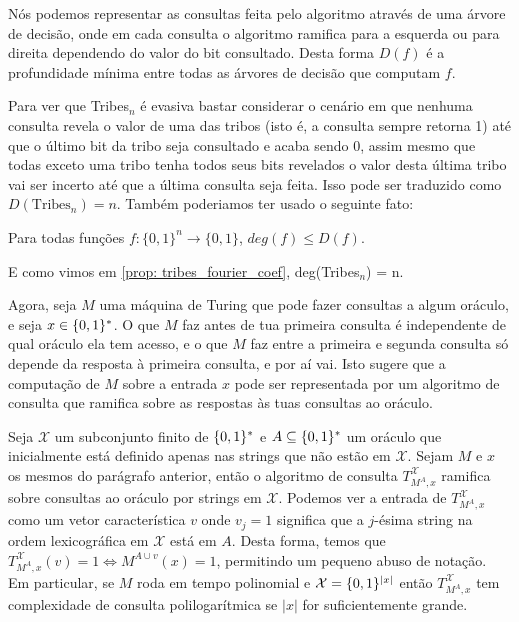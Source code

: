 Nós podemos representar as consultas feita pelo algoritmo através de uma árvore de decisão, onde em cada consulta o algoritmo ramifica para a esquerda ou para direita dependendo do valor do bit consultado. Desta forma $D(f)$ é a profundidade mínima entre todas as árvores de decisão que computam $f$.

Para ver que Tribes$_{n}$ é evasiva bastar considerar o cenário em que nenhuma consulta revela o valor de uma das tribos (isto é, a consulta sempre retorna 1) até que o último bit da tribo seja consultado e acaba sendo 0, assim mesmo que todas exceto uma tribo tenha todos seus bits revelados o valor desta última tribo vai ser incerto até que a última consulta seja feita. Isso pode ser traduzido como $D(\text{Tribes}_{n}) = n$. Também poderiamos ter usado o seguinte fato:

\begin{fato}
Para todas funções $f: \{0, 1\}^{n} \to \{0, 1\}$, $deg(f) \leq D(f)$.
\end{fato}

E como vimos em \ref{prop: tribes_fourier_coef}, deg(Tribes$_{n}$) = n.

Agora, seja $M$ uma máquina de Turing que pode fazer consultas a algum oráculo, e seja $x \in \{0, 1\}^{*}$. O que $M$ faz antes de tua primeira consulta é independente de qual oráculo ela tem acesso, e o que $M$ faz entre a primeira e segunda consulta só depende da resposta à primeira consulta, e por aí vai. Isto sugere que a computação de $M$ sobre a entrada $x$ pode ser representada por um algoritmo de consulta que ramifica sobre as respostas às tuas consultas ao oráculo.

Seja $\mathcal{X}$ um subconjunto finito de $\{0, 1\}^{*}$ e $A \subseteq \{0, 1\}^{*}$ um oráculo que inicialmente está definido apenas nas strings que não estão em $\mathcal{X}$. Sejam $M$ e $x$ os mesmos do parágrafo anterior, então o algoritmo de consulta $T_{M^{A}, x}^{\mathcal{X}}$ ramifica sobre consultas ao oráculo por strings em $\mathcal{X}$. Podemos ver a entrada de $T_{M^{A}, x}^{\mathcal{X}}$ como um vetor característica $v$ onde $v_{j} = 1$ significa que a $j$-ésima string na ordem lexicográfica em $\mathcal{X}$ está em $A$. Desta forma, temos que $T_{M^{A}, x}^{\mathcal{X}}(v) = 1 \iff M^{A \cup v}(x) = 1$, permitindo um pequeno abuso de notação. Em particular, se $M$ roda em tempo polinomial e $\mathcal{X} = \{0, 1\}^{\lvert x \rvert}$ então $T_{M^{A}, x}^{\mathcal{X}}$ tem complexidade de consulta polilogarítmica se $\lvert x \rvert$ for suficientemente grande.

